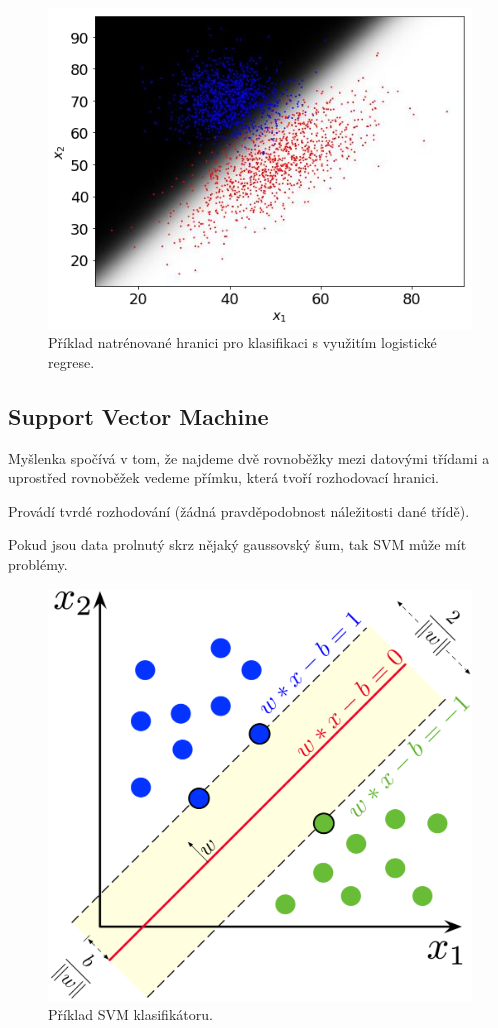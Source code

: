 \begin{figure}[H]
    \centering
    \includegraphics[width=0.7\linewidth]{logistic_regression.png}
    \caption{Příklad natrénované hranici pro klasifikaci s využitím logistické regrese.}
\end{figure}

\subsection{Support Vector Machine}

\begin{compactitem}
    \item Myšlenka spočívá v tom, že najdeme dvě rovnoběžky mezi datovými třídami a uprostřed rovnoběžek vedeme přímku, která tvoří rozhodovací hranici.

    \item Provádí tvrdé rozhodování (žádná pravděpodobnost náležitosti dané třídě).

    \item Pokud jsou data prolnutý skrz nějaký gaussovský šum, tak SVM může mít problémy.
\end{compactitem}

\begin{figure}[H]
    \centering
    \includegraphics[width=0.6\linewidth]{svm.png}
    \caption{Příklad SVM klasifikátoru.}
\end{figure}
